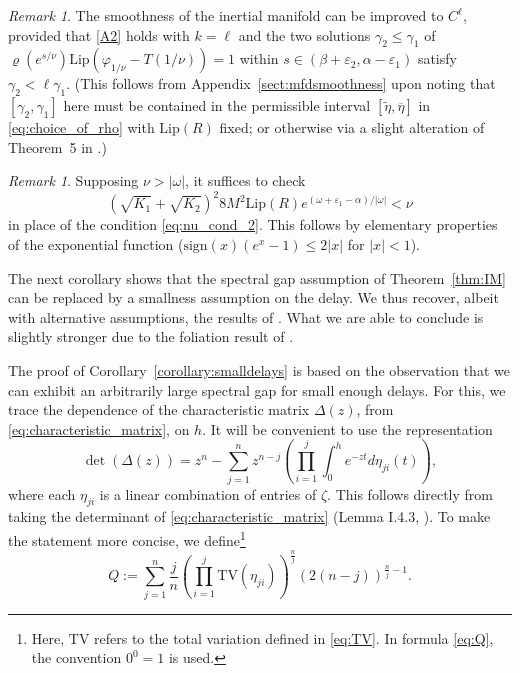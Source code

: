 \documentclass[a4paper, 12pt, oneside, reqno, notitlepage]{amsart}
\theoremstyle{plain}
\theoremstyle{definition}
\theoremstyle{remark}
\newtheorem{remark}[theorem]{Remark}
\newcommand{\lip}{\mathrm{Lip}}
\begin{document}
\begin{remark}
    The smoothness of the inertial manifold can be improved to $C^\ell$, provided that \ref{A2} holds with $k = \ell$ and the two solutions $\gamma_2 \leq \gamma_1$ of $\varrho(e^{s/\nu}) \lip(\varphi_{1/\nu}-T(1/\nu)) = 1$ within $s \in (\beta+\varepsilon_2,\alpha-\varepsilon_1)$ satisfy $\gamma_2 < \ell \gamma_1$.
    (This follows from Appendix~\ref{sect:mfdsmoothness} upon noting that $[\gamma_2,\gamma_1]$ here must be contained in the permissible interval $[\tilde{\eta},\overline{\eta}]$ in \eqref{eq:choice_of_rho} with $\lip(R)$ fixed; or otherwise via a slight alteration of Theorem~5 in \cite{irwin1980new}.) 
\end{remark}




\begin{remark} \label{remark:IM_altassumption}
    Supposing $\nu > |\omega|$, it suffices to check
    \begin{equation}
        \left(\sqrt{K_1} + \sqrt{K_2} \right)^2 8M^2  \lip(R)  e^{(\omega + \varepsilon_1 - \alpha)/|\omega|} < \nu
        \label{eq:nu_cond_remarked}
    \end{equation}
    in place of the condition \eqref{eq:nu_cond_2}.
    This follows by elementary properties of the exponential function ($\mathrm{sign}(x)(e^x-1) \leq 2|x|$ for $|x| < 1$).    
\end{remark}










The next corollary shows that the spectral gap assumption of Theorem~\ref{thm:IM} can be replaced by a smallness assumption on the delay. 
We thus recover, albeit with alternative assumptions, the results of \cite{driver1968ryabov}.
What we are able to conclude is slightly stronger due to the foliation result of \cite{chen1997invariant}.

The proof of Corollary~\ref{corollary:smalldelays} is based on the observation that we can exhibit an arbitrarily large spectral gap for small enough delays.
For this, we trace the dependence of the characteristic matrix $\Delta(z)$, from \eqref{eq:characteristic_matrix}, on $h$.
It will be convenient to use the representation
\begin{equation}
    \det(\Delta (z)) = z^n - \sum_{j=1}^n z^{n-j}\left( \prod_{i=1}^j    \int_0^h e^{-zt} d\eta_{ji}(t) \right),
    \label{eq:detDelta}
\end{equation}
where each $\eta_{ji}$ is a linear combination of entries of $\zeta$.
This follows directly from taking the determinant of \eqref{eq:characteristic_matrix} (Lemma I.4.3, \cite{diekmann2012delay}).
To make the statement more concise, we define\footnote{Here, $\mathrm{TV}$ refers to the total variation defined in \eqref{eq:TV}. In formula \eqref{eq:Q}, the convention $0^0 =1$ is used.}
\begin{equation}
    Q := \sum_{j=1}^n \frac{j}{n} \left( \prod_{i =1}^j \mathrm{TV}(\eta_{ji}) \right)^{\frac{n}{j}} (2(n-j))^{\frac{n}{j}-1}.
    \label{eq:Q}
\end{equation}
\end{document}
